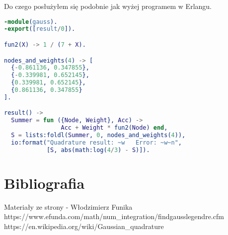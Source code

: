 \documentclass{article}
\begin{document}
\noindent
Do czego posłużyłem się podobnie jak wyżej programem w Erlangu.

\begin{lstlisting}[language=Erlang]
-module(gauss).
-export([result/0]).

fun2(X) -> 1 / (7 + X).

nodes_and_weights(4) -> [
  {-0.861136, 0.347855},
  {-0.339981, 0.652145},
  {0.339981, 0.652145},
  {0.861136, 0.347855}
].

result() ->
  Summer = fun ({Node, Weight}, Acc) ->
                Acc + Weight * fun2(Node) end,
  S = lists:foldl(Summer, 0, nodes_and_weights(4)),
  io:format("Quadrature result: ~w   Error: ~w~n",
            [S, abs(math:log(4/3) - S)]).
\end{lstlisting}

\section{Bibliografia}
Materiały ze strony - Włodzimierz Funika\\
https://www.efunda.com/math/num\_integration/findgausslegendre.cfm\\
https://en.wikipedia.org/wiki/Gaussian\_quadrature
\end{document}
